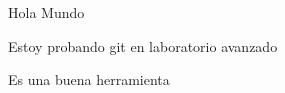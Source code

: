 \documentclass{article}
\begin{document}
Hola Mundo

Estoy probando git en laboratorio avanzado

Es una buena herramienta
\end{document}
